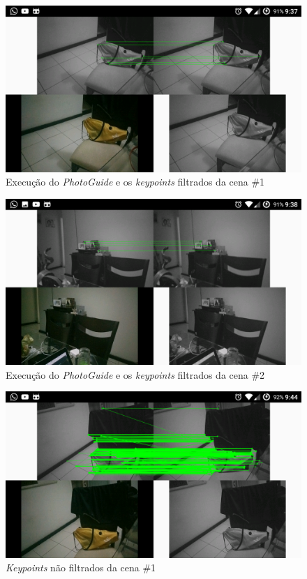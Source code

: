 \begin{figure}[!htb]
	\centering
		\includegraphics[width= \textwidth]{Imagens/figura3-8.png}
	\caption{Execução do \textit{PhotoGuide} e os \textit{keypoints} filtrados da cena \#1}
	\label{fig3:8}
\end{figure}

\begin{figure}[!htb]
	\centering
		\includegraphics[width= \textwidth]{Imagens/figura3-9.png}
	\caption{Execução do \textit{PhotoGuide} e os \textit{keypoints} filtrados da cena \#2}
	\label{fig3:9}
\end{figure}

\begin{figure}[!htb]
	\centering
		\includegraphics[width= \textwidth]{Imagens/figura3-10.png}
	\caption{\textit{Keypoints} não filtrados da cena \#1}
	\label{fig3:10}
\end{figure}


